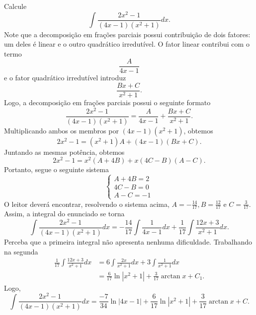 	
	\begin{ex}
		Calcule $$\int \frac{2x^2-1}{(4x-1)(x^2+1)}dx.$$ Note que a decomposição em frações parciais possui contribuição de dois fatores: um deles é linear e o outro quadrático irredutível. O fator linear contribui com o termo $$\frac{A}{4x-1}$$ e o fator quadrático irredutível introduz $$\frac{Bx + C}{x^2+1}.$$ Logo, a decomposição em frações parciais possui o seguinte formato $$\frac{2x^2-1}{(4x-1)(x^2+1)} = \frac{A}{4x-1} + \frac{Bx + C}{x^2+1}.$$ Multiplicando ambos os membros por $(4x-1)(x^2+1)$, obtemos $$2x^2-1 = (x^2+1)A + (4x-1)(Bx +C).$$ Juntando as mesmas potência, obtemos $$2x^2-1 = x^2(A+4B) + x(4C -B) (A-C).$$ Portanto, segue o seguinte sistema 
		 \[
		 \begin{cases}
		 	A + 4B = 2 \\
		 	4C - B = 0 \\
		 	A - C = -1 
		\end{cases}
		 \]	
		O leitor deverá encontrar, resolvendo o sistema acima,  $A = -\frac{14}{17}, B = \frac{12}{17}$ e $C = \frac{3}{17}$. Assim, a integral do enunciado se torna 
		$$\int \frac{2x^2-1}{(4x-1)(x^2+1)}dx = -\frac{14}{17}\int \frac{1}{4x-1}dx + \frac{1}{17} \int \frac{12x +3}{x^2+1}dx.$$ 
		Perceba que a primeira integral não apresenta nenhuma dificuldade. Trabalhando na segunda \[\begin{split}
			\frac{1}{17}\int \frac{12x +3}{x^2+1}dx &= 6\int\frac{2x}{x^2+1}dx + 3\int\frac{1}{x^2 + 1}dx \\
			& = \frac{6}{17}\ln\left|x^2 +1 \right| + \frac{3}{17}\arctan x  + C_1.
		\end{split}\] 
		Logo, $$\int \frac{2x^2-1}{(4x-1)(x^2+1)}dx =  \frac{-7}{34}\ln\left|4x-1\right| +  \frac{6}{17}\ln\left|x^2 +1 \right| + \frac{3}{17}\arctan x  + C.$$
	\end{ex}

